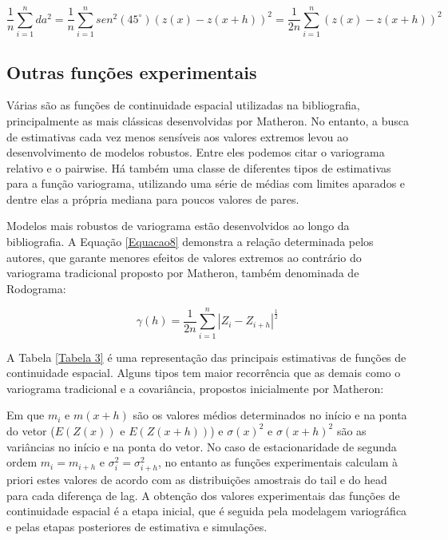 \begin{equation}\label{Equacao7}
\frac{1}{n} \sum_{i=1}^{n} da^2 =\frac{1}{n} \sum_{i=1}^{n} sen^2(45^\circ)\left( z(x) -z(x+h) \right)^2 = \frac{1}{2n} \sum_{i=1}^{n} \left( z(x) -z(x+h) \right)^2
\end{equation}

\subsection{Outras funções experimentais}

Várias são as funções de continuidade espacial utilizadas na bibliografia, principalmente as mais clássicas desenvolvidas por Matheron. No entanto, a busca de estimativas cada vez menos sensíveis aos valores extremos levou ao desenvolvimento de modelos robustos. Entre eles podemos citar o variograma relativo e o pairwise. Há também uma classe de diferentes tipos de estimativas para a função variograma, utilizando uma série de médias com limites aparados e dentre elas a própria mediana para poucos valores de pares. 

Modelos mais robustos de variograma estão desenvolvidos ao longo da bibliografia. A Equação \ref{Equacao8} demonstra a relação determinada pelos autores, que garante menores efeitos de valores extremos ao contrário do variograma tradicional proposto por Matheron, também denominada de Rodograma: 

\begin{equation}\label{Equacao8}
\gamma(h) = \frac{1}{2n} \sum_{i=1}^{n} \left|  Z_i - Z_{i+h} \right| ^\frac{1}{2}
\end{equation}

A Tabela \ref{Tabela 3} é uma representação das principais estimativas de funções de continuidade espacial. Alguns tipos tem maior recorrência que as demais como o variograma tradicional e a covariância, propostos inicialmente por Matheron:

Em que $m_i$ e $m(x+h)$ são os valores médios determinados no início e na ponta do vetor ($E(Z(x))$ e $E(Z(x+h))$) e  $\sigma(x)^2$ e $\sigma(x+h)^2$ são as variâncias no início e na ponta do vetor. No caso de estacionaridade de segunda ordem $m_i = m_{i+h}$ e  $\sigma_i^2 = \sigma_{i+h}^2$, no entanto as funções experimentais calculam à priori estes valores de acordo com as distribuições amostrais do tail e do head para cada diferença de lag. A obtenção dos valores experimentais das funções de continuidade espacial é a etapa inicial, que é seguida pela modelagem variográfica e pelas etapas posteriores de estimativa e simulações.

